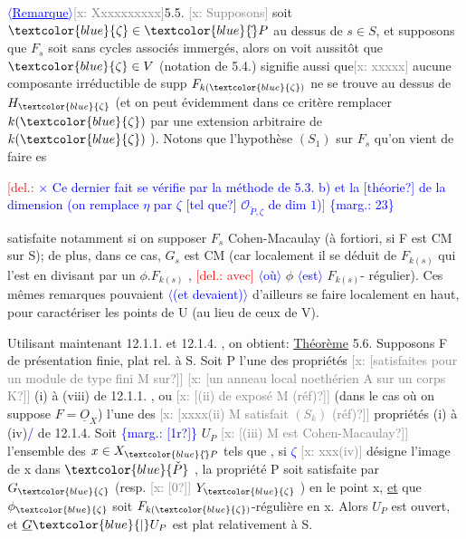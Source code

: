 \documentclass[11pt]{article}
\newcommand{\scanpage}[1]{\par\bigskip\noindent{\small\sffamily[scan #1]}\par}
\newcommand{\mspage}[1]{{\small\sffamily[p.\,#1]}}
\newcommand{\hand}[1]{\textcolor{blue}{#1}}
\newcommand{\inserted}[2][]{\textcolor{blue}{$\langle$#2$\rangle$}}
\newcommand{\margin}[1]{\textcolor{blue}{\{\textsf{marg.:} #1\}}}
\newcommand{\deleted}[1]{\textcolor{red}{[\textsf{del.:} #1]}}
\newcommand{\xout}[1]{\textcolor{gray}{[\textsf{x:} #1]}}
\newcommand{\uline}[1]{\underline{#1}}
\newcommand{\unsure}[1]{[#1?]}
\begin{document}
\inserted[typed]{\uline{Remarque}}\xout{Xxxxxxxxxx}5.5. \xout{Supposons} soit $\hand{\zeta}\in\hand{\check{}}P$ au dessus de $s\in S$, et supposons
que $F_s$ soit sans cycles associés immergés, alors on voit aussitôt que
$\hand{\zeta}\in V$ (notation de 5.4.) signifie aussi que\xout{xxxxx} aucune composante
irréductible de supp $F_{k(\hand{\zeta})}$ ne se trouve au dessus de $H_{\hand{\zeta}}$ (et on peut
évidemment dans ce critère remplacer $k(\hand{\zeta})$ par une extension arbitraire
de $k(\hand{\zeta})$ ). Notons que l'hypothèse $(S_1)$ sur $F_s$ qu'on vient de faire es

\deleted{\hand{$\times$ Ce dernier fait se vérifie par la méthode de 5.3. b) et la \unsure{théorie}
de la dimension (on remplace $\eta$ par $\zeta$ \unsure{tel que} $\mathcal{O}_{\check{P},\zeta}$ de dim $1$)}}
\margin{23}

\clearpage
\scanpage{25/24}
\mspage{\hand{21}}

satisfaite notamment si on supposer $F_s$ Cohen-Macaulay (à fortiori, si
F est CM sur S); de plus, dans ce cas, $G_s$ est CM (car localement il se
déduit de $F_{k(s)}$ qui l'est en divisant par un $\phi . F_{k(s)}$ , \deleted{avec} \inserted{où} $\phi$ \inserted{est} $F_{k(s)}$-%
régulier). Ces mêmes remarques pouvaient \inserted{(et devaient)} d'ailleurs se faire localement
en haut, pour caractériser les points de U (au lieu de ceux de V).

Utilisant maintenant 12.1.1. et 12.1.4. , on obtient:
\uline{Théorème} 5.6. Supposons F de présentation finie, plat rel. à S. Soit
P l'une des propriétés \xout{\unsure{satisfaites pour un module de type fini M sur}}
\xout{\unsure{un anneau local noethérien A sur un corps K}} (i) à (viii) de 12.1.1. ,
ou \xout{\unsure{(ii) de exposé M (réf)}} (dans le cas où on suppose $F=\underline{O}_X$) l'une des
\xout{\unsure{xxxx(ii) M satisfait $(S_k)$ (réf)}} propriétés (i) à (iv)\hand{/} de 12.1.4. Soit
\margin{\unsure{1r}} $U_P$ \xout{\unsure{(iii) M est Cohen-Macaulay}} l'ensemble des $x \in X_{\hand{\check{}}P}$ tels que , si \hand{$\zeta$}
\xout{xxx(iv)} désigne l'image de x dans $\hand{\check{P}}$ , la propriété P soit satisfaite
par $G_{\hand{\zeta}}$ (resp. \xout{\unsure{0}} $Y_{\hand{\zeta}}$ ) en le point x, \uline{et} que $\phi_{\hand{\zeta}}$ soit $F_{k(\hand{\zeta})}$-régulière en x.
Alors $U_P$ est ouvert, et $\underline{G}\hand{|}U_P$ est plat relativement à S.
\end{document}
